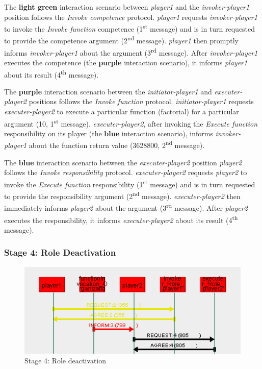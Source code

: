 The \textbf{light green} interaction scenario between \textit{player1} and the \textit{invoker-player1} position follows the \textit{Invoke competence} protocol.
\textit{player1} requests \textit{invoker-player1} to invoke the \textit{Invoke function} competence (1\textsuperscript{st} message) and is in turn requested to provide the competence argument (2\textsuperscript{nd} message).
\textit{player1} then promptly informs \textit{invoker-player1} about the argument (3\textsuperscript{rd} message).
After \textit{invoker-player1} executes the competence (the \textbf{purple} interaction scenario), it informs \textit{player1} about its result (4\textsuperscript{th} message).

The \textbf{purple} interaction scenario between the \textit{initiator-player1} and \textit{executer-player2} positions follows the \textit{Invoke function} protocol.
\textit{initiator-player1} requests \textit{executer-player2} to execute a particular function (factorial) for a particular argument (10, 1\textsuperscript{st} message).
\textit{executer-player2}, after invoking the \textit{Execute function} responsibility on its player (the \textbf{blue} interaction scenario), informs \textit{invoker-player1} about the function return value (3628800, 2\textsuperscript{nd} message).

The \textbf{blue} interaction scenario between the \textit{executer-player2} position \textit{player2} follows the \textit{Invoke responsibility} protocol.
\textit{executer-player2} requests \textit{player2} to invoke the \textit{Execute function} responsibility (1\textsuperscript{st} message) and is in turn requested to provide the responsibility argument (2\textsuperscript{nd} message).
\textit{executer-player2} then immediately informs \textit{player2} about the argument (3\textsuperscript{rd} message).
After \textit{player2} executes the responsibility, it informs \textit{executer-player2} about its result (4\textsuperscript{th} message).

\subsubsection*{Stage 4: Role Deactivation}

\begin{figure}[H]
	\centering
	\includegraphics[width=\textwidth]{images/examples/example1-stage4.png}
	\caption{Stage 4: Role deactivation}
	\label{figure:example1-stage4}
\end{figure}

